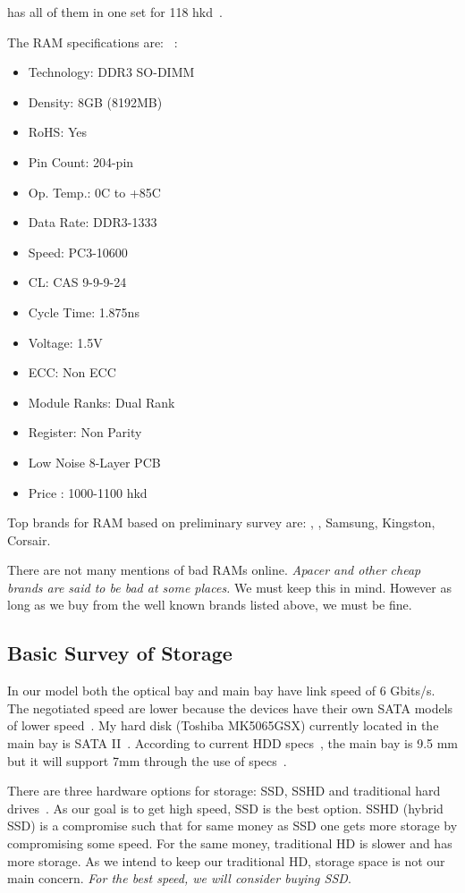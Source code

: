 \macsales has all of them in one set for 118 hkd~\cite{owcalltools}.

The RAM specifications are: ~\cite{macsalesramin,ifixitramdet}:

\begin{itemize}
\item Technology: DDR3 SO-DIMM
\item Density: 8GB (8192MB)
\item RoHS: Yes
\item Pin Count: 204-pin
\item Op. Temp.: 0C to +85C
\item Data Rate: DDR3-1333
\item Speed: PC3-10600
\item CL: CAS 9-9-9-24
\item Cycle Time: 1.875ns
\item Voltage: 1.5V
\item ECC: Non ECC
\item Module Ranks: Dual Rank
\item Register: Non Parity
\item Low Noise 8-Layer PCB
\item Price : 1000-1100 hkd~\cite{crucialramlist,macsalesramin,ifixitramdet}
\end{itemize}

Top brands for RAM based on preliminary survey are: \macsales, \crucial, Samsung, Kingston, Corsair.

There are not many mentions of bad RAMs online. \emph {Apacer and other cheap brands are said to be bad at some places.} We must keep this in mind. However as long as we buy from the well known brands listed above, we must be fine. 

\subsection{Basic Survey of Storage}

In our model both the optical bay and main bay have link speed of 6 Gbits/s. The negotiated speed are lower because the devices have their own SATA models of lower speed~\cite{applestacksata,tomshardsata}.
My hard disk (Toshiba MK5065GSX) currently located in the main bay is SATA II~\cite{amazonharddiskdet}. According to current HDD specs~\cite{toshibadet}, the main bay is 9.5 mm but it will support 7mm through the use of specs~\cite{suhdd79}.

There are three hardware options for storage: SSD, SSHD and traditional hard drives~\cite{techadsshd,seagatesshd}. As our goal is to get high speed, SSD is the best option. SSHD (hybrid SSD) is a compromise such that for same money as SSD one gets more storage by compromising some speed. For the same money, traditional HD is slower and has more storage. As we intend to keep our traditional HD, storage space is not our main concern. \emph{ For the best speed, we will consider buying SSD}. 
  
